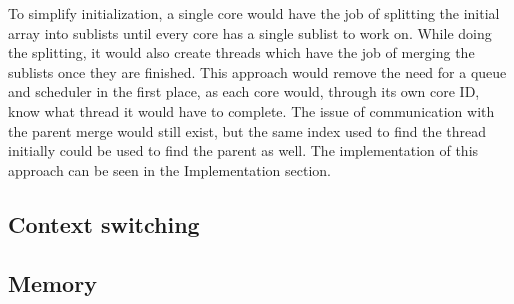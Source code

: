  To simplify initialization, a single core would have the job of splitting the
 initial array into sublists until every core has a single sublist to work on.
 While doing the splitting, it would also create threads which have the job of
 merging the sublists once they are finished. This approach would remove the
 need for a queue and scheduler in the first place, as each core would, through
 its own core ID, know what thread it would have to complete. The issue of
 communication with the parent merge would still exist, but the same index used
 to find the thread initially could be used to find the parent as well. The
 implementation of this approach can be seen in the Implementation section.


\subsection{Context switching}



\subsection{Memory}
